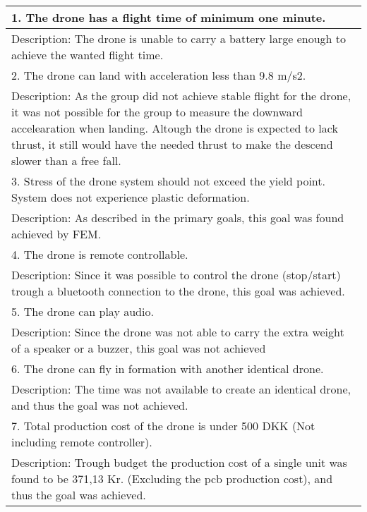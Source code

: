 \begin{center}
  \begin{tabular}{| m{33em} |}
      \hline
      \color{BrickRed}
      1. The drone has a flight time of minimum one minute.  \\ 
      \hline
      Description:  The drone is unable to carry a battery large enough to achieve the wanted flight time. \\ 
      \hline
      \hline
      \color{YellowOrange}
      2. The drone can land with acceleration less than 9.8 
      m/s2. \\ 
      \hline
      Description:   As the group did not achieve stable flight for the drone, it was not possible for the group to measure the downward accelearation when landing. 
      Altough the drone is expected to lack thrust, it still would have the needed thrust to make the descend slower than a free fall.\\ 
      \hline
      \hline
      \color{ForestGreen}
      3. Stress of the drone system should not exceed the 
      yield point. System does not experience plastic 
      deformation. \\
      \hline
      Description:  As described in the primary goals, this goal was found achieved by FEM. \\ 
      \hline
      \hline
      \color{ForestGreen}
      4. The drone is remote controllable. \\
      \hline
      Description:  Since it was possible to control the drone (stop/start) trough a bluetooth connection to the drone, this goal was achieved. \\ 
      \hline
      \hline
      \color{BrickRed}
      5. The drone can play audio.\\
      \hline
      Description:   Since the drone was not able to carry the extra weight of a speaker or a buzzer, this goal was not achieved\\ 
      \hline
      \hline
      \color{BrickRed}
      6. The drone can fly in formation with another 
      identical drone. \\
      \hline
      Description:  The time was not available to create an identical drone, and thus the goal was not achieved. \\ 
      \hline
      \hline
      \color{ForestGreen}
      7. Total production cost of the drone is under 500 DKK 
      (Not including remote controller). \\
      \hline
      Description:  Trough budget the production cost of a single unit was found to be 371,13 Kr. (Excluding the pcb production cost), and thus the goal was achieved. \\ 
      \hline
  \end{tabular}


\end{center}
